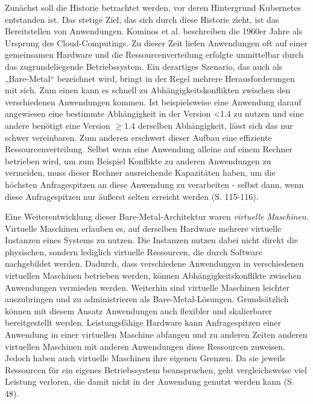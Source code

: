 \documentclass[11pt,a4paper]{article}
\begin{document}
Zunächst soll die Historie betrachtet werden, vor deren Hintergrund Kubernetes entstanden ist.
Das stetige Ziel, das sich durch diese Historie zieht, ist das Bereitstellen von Anwendungen.
Kominos et al. \cite{7899247} beschreiben die 1960er Jahre als Ursprung des Cloud-Computings.
Zu dieser Zeit liefen Anwendungen oft auf einer gemeinsamen Hardware und die Ressourcenverteilung erfolgte unmittelbar durch das zugrundeliegende Betriebssystem.
Ein derartiges Szenario, das auch als „Bare-Metal“ bezeichnet wird, bringt in der Regel mehrere Herausforderungen mit sich.
Zum einen kann es schnell zu Abhängigkeitskonflikten zwischen den verschiedenen Anwendungen kommen.
Ist beispielsweise eine Anwendung darauf angewiesen eine bestimmte Abhängigkeit in der Version <1.4 zu nutzen und eine andere
benötigt eine Version \(\geq 1.4\) derselben Abhängigkeit, lässt sich das nur schwer vereinbaren.
Zum anderen erschwert dieser Aufbau eine effiziente Ressourcenverteilung.
Selbst wenn eine Anwendung alleine auf einem Rechner betrieben wird, um zum Beispiel Konflikte zu anderen
Anwendungen zu vermeiden, muss dieser Rechner ausreichende Kapazitäten haben, um die höchsten Anfragespitzen an diese Anwendung zu verarbeiten -
selbst dann, wenn diese Anfragespitzen nur äußerst selten erreicht werden \cite{Schmeling_Dargatz_2022} (S. 115-116).

Eine Weiterentwicklung dieser Bare-Metal-Architektur waren \emph{virtuelle Maschinen}.
Virtuelle Maschinen erlauben es, auf derselben Hardware mehrere virtuelle Instanzen eines
Systems zu nutzen. Die Instanzen nutzen dabei nicht direkt die physischen, sondern lediglich virtuelle Ressourcen,
die durch Software nachgebildet werden.
Dadurch, dass verschiedene Anwendungen in verschiedenen virtuellen Maschinen betrieben werden, können Abhängigkeitskonflikte zwischen Anwendungen
vermieden werden. Weiterhin sind virtuelle Maschinen leichter auszubringen und zu administrieren als Bare-Metal-Lösungen.
Grundsätzlich können mit diesem Ansatz Anwendungen auch flexibler und skalierbarer bereitgestellt werden.
Leistungsfähige Hardware kann Anfragespitzen einer Anwendung in einer virtuellen Maschine abfangen und
zu anderen Zeiten anderen virtuellen Maschinen mit anderen
Anwendungen diese Ressourcen zuweisen.
Jedoch haben auch virtuelle Maschinen ihre eigenen Grenzen.
Da sie jeweils Ressourcen für ein eigenes Betriebssystem beanspruchen, geht vergleichsweise viel Leistung verloren,
die damit nicht in der Anwendung genutzt werden kann \cite{kofler2021docker} (S. 48).
\end{document}
